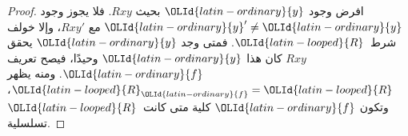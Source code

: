 \documentclass[../../../include/open-logic-section]{subfiles}
\begin{document}
\begin{proof}
افرض وجود ${\OLId{latin-ordinary}{y}}$ بحيث $Rxy$. فلا يجوز وجود ${\OLId{latin-ordinary}{y}}' \neq {\OLId{latin-ordinary}{y}}$ مع $Rxy'$،
وإلا خولف شرط~${\OLId{latin-looped}{R}}$. فمتى وجد ${\OLId{latin-ordinary}{y}}$ يحقق $Rxy$ كان هذا ${\OLId{latin-ordinary}{y}}$ وحيدًا،
فيصح تعريف ${\OLId{latin-ordinary}{f}}$. ومنه يظهر ${\OLId{latin-looped}{R}}_{\OLId{latin-ordinary}{f}} = {\OLId{latin-looped}{R}}$، وتكون ${\OLId{latin-ordinary}{f}}$ كلية متى
كانت~${\OLId{latin-looped}{R}}$ تسلسلية.
\end{proof}
\end{document}
